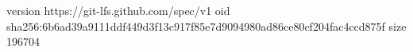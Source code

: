 version https://git-lfs.github.com/spec/v1
oid sha256:6b6ad39a9111ddf449d3f13c917f85e7d9094980ad86ce80cf204fac4ccd875f
size 196704
